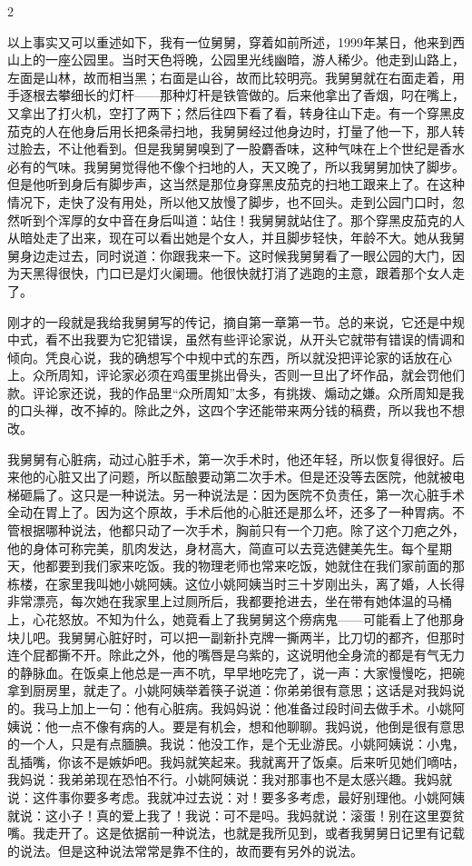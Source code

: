 2 

以上事实又可以重述如下，我有一位舅舅，穿着如前所述，1999年某日，他来到西山上的一座公园里。当时天色将晚，公园里光线幽暗，游人稀少。他走到山路上，左面是山林，故而相当黑；右面是山谷，故而比较明亮。我舅舅就在右面走着，用手逐根去攀细长的灯杆——那种灯杆是铁管做的。后来他拿出了香烟，叼在嘴上，又拿出了打火机，空打了两下；然后往四下看了看，转身往山下走。有一个穿黑皮茄克的人在他身后用长把条帚扫地，我舅舅经过他身边时，打量了他一下，那人转过脸去，不让他看到。但是我舅舅嗅到了一股麝香味，这种气味在上个世纪是香水必有的气味。我舅舅觉得他不像个扫地的人，天又晚了，所以我舅舅加快了脚步。但是他听到身后有脚步声，这当然是那位身穿黑皮茄克的扫地工跟来上了。在这种情况下，走快了没有用处，所以他又放慢了脚步，也不回头。走到公园门口时，忽然听到个浑厚的女中音在身后叫道：站住！我舅舅就站住了。那个穿黑皮茄克的人从暗处走了出来，现在可以看出她是个女人，并且脚步轻快，年龄不大。她从我舅舅身边走过去，同时说道：你跟我来一下。这时候我舅舅看了一眼公园的大门，因为天黑得很快，门口已是灯火阑珊。他很快就打消了逃跑的主意，跟着那个女人走了。 

刚才的一段就是我给我舅舅写的传记，摘自第一章第一节。总的来说，它还是中规中式，看不出我要为它犯错误，虽然有些评论家说，从开头它就带有错误的情调和倾向。凭良心说，我的确想写个中规中式的东西，所以就没把评论家的话放在心上。众所周知，评论家必须在鸡蛋里挑出骨头，否则一旦出了坏作品，就会罚他们款。评论家还说，我的作品里“众所周知”太多，有挑拨、煽动之嫌。众所周知是我的口头禅，改不掉的。除此之外，这四个字还能带来两分钱的稿费，所以我也不想改。 

我舅舅有心脏病，动过心脏手术，第一次手术时，他还年轻，所以恢复得很好。后来他的心脏又出了问题，所以酝酿要动第二次手术。但是还没等去医院，他就被电梯砸扁了。这只是一种说法。另一种说法是：因为医院不负责任，第一次心脏手术全动在胃上了。因为这个原故，手术后他的心脏还是那么坏，还多了一种胃病。不管根据哪种说法，他都只动了一次手术，胸前只有一个刀疤。除了这个刀疤之外，他的身体可称完美，肌肉发达，身材高大，简直可以去竞选健美先生。每个星期天，他都要到我们家来吃饭。我的物理老师也常来吃饭，她就住在我们家前面的那栋楼，在家里我叫她小姚阿姨。这位小姚阿姨当时三十岁刚出头，离了婚，人长得非常漂亮，每次她在我家里上过厕所后，我都要抢进去，坐在带有她体温的马桶上，心花怒放。不知为什么，她竟看上了我舅舅这个痨病鬼——可能看上了他那身块儿吧。我舅舅心脏好时，可以把一副新扑克牌一撕两半，比刀切的都齐，但那时连个屁都撕不开。除此之外，他的嘴唇是乌紫的，这说明他全身流的都是有气无力的静脉血。在饭桌上他总是一声不吭，早早地吃完了，说一声：大家慢慢吃，把碗拿到厨房里，就走了。小姚阿姨举着筷子说道：你弟弟很有意思；这话是对我妈说的。我马上加上一句：他有心脏病。我妈妈说：他准备过段时间去做手术。小姚阿姨说：他一点不像有病的人。要是有机会，想和他聊聊。我妈说，他倒是很有意思的一个人，只是有点腼腆。我说：他没工作，是个无业游民。小姚阿姨说：小鬼，乱插嘴，你该不是嫉妒吧。我妈就笑起来。我就离开了饭桌。后来听见她们嘀咕，我妈说：我弟弟现在恐怕不行。小姚阿姨说：我对那事也不是太感兴趣。我妈就说：这件事你要多考虑。我就冲过去说：对！要多多考虑，最好别理他。小姚阿姨就说：这小子！真的爱上我了！我说：可不是吗。我妈就说：滚蛋！别在这里耍贫嘴。我走开了。这是依据前一种说法，也就是我所见到，或者我舅舅日记里有记载的说法。但是这种说法常常是靠不住的，故而要有另外的说法。 


